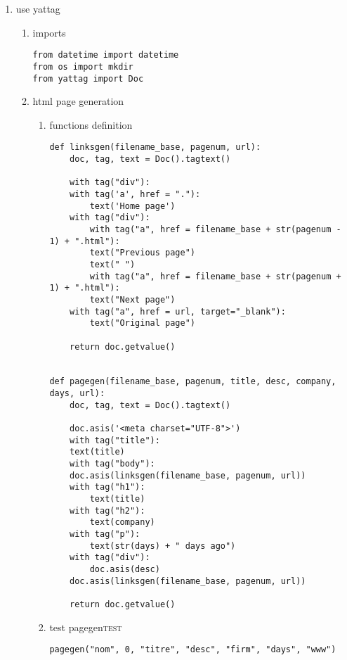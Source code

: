 \documentclass[11pt]{article}
\begin{document}
\begin{enumerate}
\item use yattag
\label{sec:orgae80064}
\begin{enumerate}
\item imports
\label{sec:orgf5fd75b}
\begin{verbatim}
from datetime import datetime
from os import mkdir
from yattag import Doc
\end{verbatim}

\item html page generation
\label{sec:org6135e12}
\begin{enumerate}
\item functions definition
\label{sec:org26bd76f}
\begin{verbatim}
def linksgen(filename_base, pagenum, url):
    doc, tag, text = Doc().tagtext()

    with tag("div"):
	with tag('a', href = "."):
	    text('Home page')
	with tag("div"):
	    with tag("a", href = filename_base + str(pagenum - 1) + ".html"):
		text("Previous page")
	    text(" ")
	    with tag("a", href = filename_base + str(pagenum + 1) + ".html"):
		text("Next page")
	with tag("a", href = url, target="_blank"):
	    text("Original page")

    return doc.getvalue()


def pagegen(filename_base, pagenum, title, desc, company, days, url):
    doc, tag, text = Doc().tagtext()

    doc.asis('<meta charset="UTF-8">')
    with tag("title"):
	text(title)
    with tag("body"):
	doc.asis(linksgen(filename_base, pagenum, url))
	with tag("h1"):
	    text(title)
	with tag("h2"):
	    text(company)
	with tag("p"):
	    text(str(days) + " days ago")
	with tag("div"):
	    doc.asis(desc)
	doc.asis(linksgen(filename_base, pagenum, url))

    return doc.getvalue()
\end{verbatim}

\item test pagegen\hfill{}\textsc{test}
\label{sec:org0f00d9b}
\begin{verbatim}
pagegen("nom", 0, "titre", "desc", "firm", "days", "www")
\end{verbatim}


\end{enumerate}
\end{enumerate}
\end{enumerate}
\end{document}
